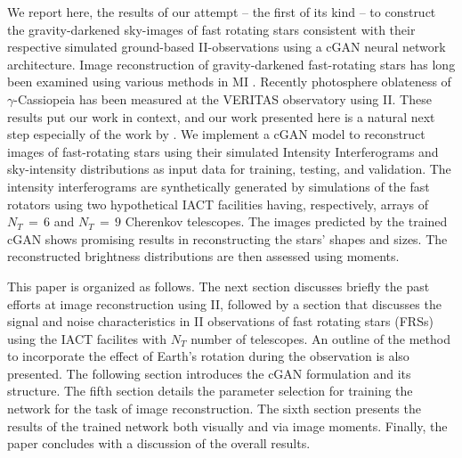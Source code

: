 We report here, the results of our attempt -- the first of its kind -- to construct the gravity-darkened sky-images of fast rotating stars consistent with their respective simulated ground-based II-observations using a cGAN neural network architecture. Image reconstruction of gravity-darkened fast-rotating stars has long been examined using various methods in MI \citep{vanBelle2001, DomicianodeSouza2003, DomicianodeSouza2005, mcalister2005first, Monnier2007, Pedretti2009, Zhao2009, Martinez2021}. Recently photosphere oblateness of $\gamma$-Cassiopeia \citep{Archer-arXiv-2025} has been measured at the VERITAS observatory using II. These results put our work in context, and our work presented here is a natural next step especially of the work by \cite{Archer-arXiv-2025}. We implement a cGAN model \citep{isola2017image} to reconstruct images of fast-rotating stars using their simulated Intensity Interferograms and sky-intensity distributions as input data for training, testing, and validation. The intensity interferograms are synthetically generated by simulations of the fast rotators using two hypothetical IACT facilities having, respectively, arrays of $N_T\, =\, 6$ and $N_T\, =\, 9$ Cherenkov telescopes. The images predicted by the trained cGAN shows promising results in reconstructing the stars' shapes and sizes. The reconstructed brightness distributions are then assessed using moments.

This paper is organized as follows. The next section discusses briefly the past efforts at image reconstruction using II, followed by a section that discusses the signal and noise characteristics in II observations of fast rotating stars (FRSs) using the IACT facilites with $N_T$ number of telescopes. An outline of the method to incorporate the effect of Earth's rotation during the observation is also presented. The following section introduces the cGAN formulation and its structure. The fifth section details the parameter selection for training the network for the task of image reconstruction. The sixth section presents the results of the trained network both visually and via image moments. Finally, the paper concludes with a discussion of the overall results.

